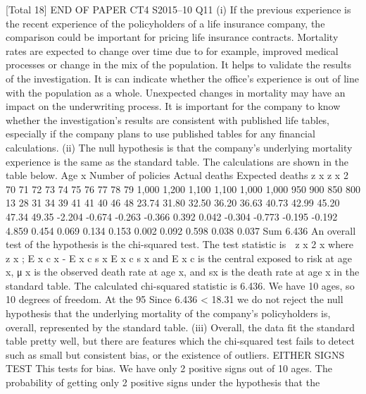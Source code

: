 [Total 18]
END OF PAPER
CT4 S2015–10
Q11
(i)
If the previous experience is the recent experience of the policyholders of a
life insurance company, the comparison could be important for pricing life
insurance contracts.
Mortality rates are expected to change over time due to for example, improved
medical processes or change in the mix of the population.
It helps to validate the results of the investigation.
It is can indicate whether the office’s experience is out of line with the
population as a whole.
Unexpected changes in mortality may have an impact on the underwriting
process.
It is important for the company to know whether the investigation’s results are
consistent with published life tables, especially if the company plans to use
published tables for any financial calculations.
(ii)
The null hypothesis is that the company's underlying mortality experience is
the same as the standard table.
The calculations are shown in the table below.
Age x Number of
policies Actual
deaths Expected
deaths z x z x 2
70
71
72
73
74
75
76
77
78
79 1,000
1,200
1,100
1,100
1,000
1,000
950
900
850
800 13
28
31
34
39
41
41
40
46
48 23.74
31.80
32.50
36.20
36.63
40.73
42.99
45.20
47.34
49.35 -2.204
-0.674
-0.263
-0.366
0.392
0.042
-0.304
-0.773
-0.195
-0.192 4.859
0.454
0.069
0.134
0.153
0.002
0.092
0.598
0.038
0.037
Sum
6.436
An overall test of the hypothesis is the chi-squared test.
The test statistic is
 z x 2
x
where
z x ;\+\;
E x c \mu x - E x c \mu s x
E x c \mu s x
and
E x c is the central exposed to risk at age x, μ x is the observed death rate at age
x, and \mu sx is the death rate at age x in the standard table.
The calculated chi-squared statistic is 6.436.
We have 10 ages, so 10 degrees of freedom.
At the 95%
Since 6.436 < 18.31
we do not reject the null hypothesis that the underlying mortality of the
company’s policyholders is, overall, represented by the standard table.
(iii)
Overall, the data fit the standard table pretty well, but there are features which
the chi-squared test fails to detect such as small but consistent bias, or the
existence of outliers.
EITHER SIGNS TEST
This tests for bias.
We have only 2 positive signs out of 10 ages.
The probability of getting only 2 positive signs under the hypothesis that the
